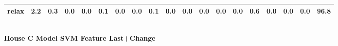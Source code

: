 \documentclass{article}
\begin{document}
\begin{sideways}
\begin{tabular}{lrrrrrrrrrrrrrrrrrr}
relax                         &         2.2 &                0.3 &           0.0 &                          0.0 &                0.1 &                0.0 &                        0.0 &          0.1 &              0.0 &                0.0 &                    0.0 &                      0.0 &                  0.0 &                   0.6 &              0.0 &              0.0 &                                  0.0 &         96.8 \\
\bottomrule
\end{tabular}
\end{sideways}
\normalsize
\vspace{1cm}\\
\textbf{House C Model SVM Feature Last+Change}\\
\vspace{1cm}\\
\end{document}
